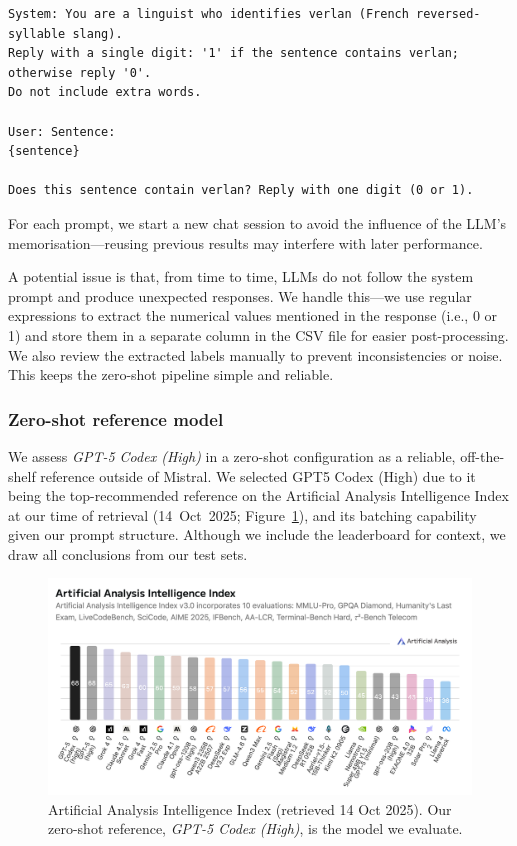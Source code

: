 \documentclass[12pt]{article}
\begin{document}
\begin{lstlisting}
System: You are a linguist who identifies verlan (French reversed-syllable slang).
Reply with a single digit: '1' if the sentence contains verlan; otherwise reply '0'.
Do not include extra words.

User: Sentence:
{sentence}

Does this sentence contain verlan? Reply with one digit (0 or 1).
\end{lstlisting}

For each prompt, we start a new chat session to avoid the influence of the LLM's memorisation\;---\;reusing previous results may interfere with later performance.

A potential issue is that, from time to time, LLMs do not follow the system prompt and produce unexpected responses. We handle this\;---\;we use regular expressions to extract the numerical values mentioned in the response (i.e., 0 or 1) and store them in a separate column in the CSV file for easier post-processing. We also review the extracted labels manually to prevent inconsistencies or noise. This keeps the zero-shot pipeline simple and reliable.

%
\subsubsection{Zero-shot reference model}

We assess \textit{GPT-5 Codex (High)} in a zero-shot configuration as a reliable, off-the-shelf reference outside of Mistral. We selected GPT5 Codex (High) due to it being the top-recommended reference on the Artificial Analysis Intelligence Index at our time of retrieval (14~Oct~2025; Figure~\ref{fig:AI_Index}), and its batching capability given our prompt structure. Although we include the leaderboard for context, we draw all conclusions from our test sets.

\begin{figure}[H]
\centering
\includegraphics[width=\textwidth]{figures/Artificial Analysis Intelligence Index (14 Oct '25) .png}
\caption{\label{fig:AI_Index}Artificial Analysis Intelligence Index (retrieved 14 Oct 2025). Our zero-shot reference, \textit{GPT-5 Codex (High)}, is the model we evaluate.}
\end{figure}
\end{document}
